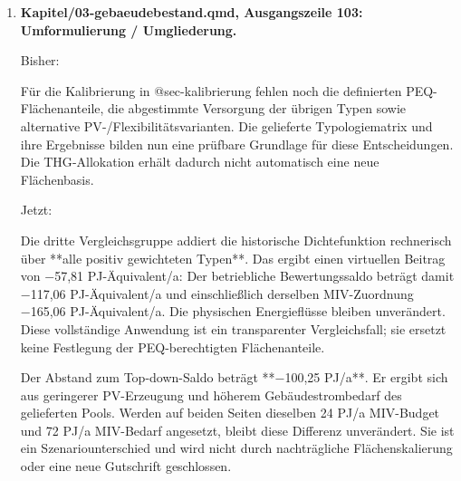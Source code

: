 \documentclass[
  ngerman,
  a4paper,
  DIV=11]{scrreprt}
\newenvironment{Shaded}{\begin{snugshade}}{\end{snugshade}}
\newcommand{\NormalTok}[1]{\textcolor[rgb]{0.00,0.23,0.31}{#1}}
\begin{document}
\begin{enumerate}
\begin{Shaded}
\begin{Highlighting}[]
\NormalTok{::: \{.content{-}visible when{-}format="html"\}}
\NormalTok{\textasciigrave{}\textasciigrave{}\textasciigrave{}\{=html\}}
\NormalTok{\textless{}iframe src="../Abbildungen/methodik/sektorvergleich.html" title="Sektorvergleich Top{-}down, Bottom{-}up und Dichte{-}Bewertung" style="width:100\%;height:690px;border:0" loading="lazy"\textgreater{}\textless{}/iframe\textgreater{}}
\NormalTok{\textasciigrave{}\textasciigrave{}\textasciigrave{}}
\NormalTok{[Grafik separat öffnen](../Abbildungen/methodik/sektorvergleich.html)}
\NormalTok{:::}
\end{Highlighting}
\end{Shaded}
\item
  \textbf{Kapitel/03-gebaeudebestand.qmd, Ausgangszeile 103:
  Umformulierung / Umgliederung.}

  Bisher:

\begin{Shaded}
\begin{Highlighting}[]
\NormalTok{Für die Kalibrierung in @sec{-}kalibrierung fehlen noch die definierten PEQ{-}Flächenanteile, die abgestimmte Versorgung der übrigen Typen sowie alternative PV{-}/Flexibilitätsvarianten. Die gelieferte Typologiematrix und ihre Ergebnisse bilden nun eine prüfbare Grundlage für diese Entscheidungen. Die THG{-}Allokation erhält dadurch nicht automatisch eine neue Flächenbasis.}
\end{Highlighting}
\end{Shaded}

  Jetzt:

\begin{Shaded}
\begin{Highlighting}[]
\NormalTok{Die dritte Vergleichsgruppe addiert die historische Dichtefunktion rechnerisch über **alle positiv gewichteten Typen**. Das ergibt einen virtuellen Beitrag von −57,81 PJ{-}Äquivalent/a: Der betriebliche Bewertungssaldo beträgt damit −117,06 PJ{-}Äquivalent/a und einschließlich derselben MIV{-}Zuordnung −165,06 PJ{-}Äquivalent/a. Die physischen Energieflüsse bleiben unverändert. Diese vollständige Anwendung ist ein transparenter Vergleichsfall; sie ersetzt keine Festlegung der PEQ{-}berechtigten Flächenanteile.}


\NormalTok{Der Abstand zum Top{-}down{-}Saldo beträgt **−100,25 PJ/a**. Er ergibt sich aus geringerer PV{-}Erzeugung und höherem Gebäudestrombedarf des gelieferten Pools. Werden auf beiden Seiten dieselben 24 PJ/a MIV{-}Budget und 72 PJ/a MIV{-}Bedarf angesetzt, bleibt diese Differenz unverändert. Sie ist ein Szenariounterschied und wird nicht durch nachträgliche Flächenskalierung oder eine neue Gutschrift geschlossen.}


\end{Highlighting}
\end{Shaded}
\end{enumerate}
\end{document}
